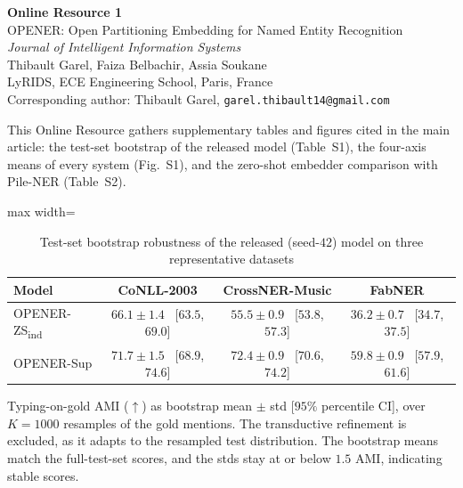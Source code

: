 \documentclass[10pt]{article}
\newcommand{\zsind}{OPENER-ZS\textsubscript{ind}}
\begin{document}
\begin{center}
{\Large\bfseries Online Resource 1}\\[6pt]
{\large OPENER: Open Partitioning Embedding for Named Entity Recognition}\\[4pt]
\textit{Journal of Intelligent Information Systems}\\[6pt]
Thibault Garel, Faiza Belbachir, Assia Soukane\\
LyRIDS, ECE Engineering School, Paris, France\\
Corresponding author: Thibault Garel, \texttt{garel.thibault14@gmail.com}
\end{center}

\medskip
\noindent This Online Resource gathers supplementary tables and figures cited in the main article: the test-set bootstrap of the released model (Table~S1), the four-axis means of every system (Fig.~S1), and the zero-shot embedder comparison with Pile-NER (Table~S2).

\begin{table}[h]
\centering
\caption{Test-set bootstrap robustness of the released (seed-$42$) model on three representative datasets}
\label{tab:bootstrap}
\small
\begin{adjustbox}{max width=\textwidth}
\begin{threeparttable}
\begin{tabular}{lccc}
\toprule
Model & CoNLL-2003 & CrossNER-Music & FabNER \\
\midrule
\zsind{}   & $66.1 \pm 1.4$ ~[$63.5$, $69.0$] & $55.5 \pm 0.9$ ~[$53.8$, $57.3$] & $36.2 \pm 0.7$ ~[$34.7$, $37.5$] \\
OPENER-Sup & $71.7 \pm 1.5$ ~[$68.9$, $74.6$] & $72.4 \pm 0.9$ ~[$70.6$, $74.2$] & $59.8 \pm 0.9$ ~[$57.9$, $61.6$] \\
\bottomrule
\end{tabular}
\begin{tablenotes}[flushleft]
\footnotesize
\item Typing-on-gold AMI ($\uparrow$) as bootstrap mean $\pm$ std [$95\%$ percentile CI], over $K{=}1000$ resamples of the gold mentions. The transductive refinement is excluded, as it adapts to the resampled test distribution. The bootstrap means match the full-test-set scores, and the stds stay at or below $1.5$ AMI, indicating stable scores.
\end{tablenotes}
\end{threeparttable}
\end{adjustbox}
\end{table}
\end{document}
